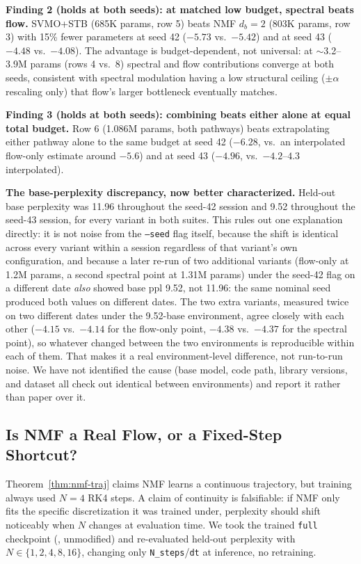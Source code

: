 \documentclass[conference]{IEEEtran}
\begin{document}
\textbf{Finding 2 (holds at both seeds): at matched low budget, spectral beats flow.} SVMO+STB (685K params, row 5) beats NMF $d_b{=}2$ (803K params, row 3) with 15\% fewer parameters at seed 42 ($-5.73$ vs.\ $-5.42$) and at seed 43 ($-4.48$ vs.\ $-4.08$). The advantage is budget-dependent, not universal: at $\sim$3.2--3.9M params (rows 4 vs.\ 8) spectral and flow contributions converge at both seeds, consistent with spectral modulation having a low structural ceiling ($\pm\alpha$ rescaling only) that flow's larger bottleneck eventually matches.

\textbf{Finding 3 (holds at both seeds): combining beats either alone at equal total budget.} Row 6 (1.086M params, both pathways) beats extrapolating either pathway alone to the same budget at seed 42 ($-6.28$, vs.\ an interpolated flow-only estimate around $-5.6$) and at seed 43 ($-4.96$, vs.\ $-4.2$--$4.3$ interpolated).

\textbf{The base-perplexity discrepancy, now better characterized.} Held-out base perplexity was 11.96 throughout the seed-42 session and 9.52 throughout the seed-43 session, for every variant in both suites. This rules out one explanation directly: it is not noise from the \texttt{--seed} flag itself, because the shift is identical across every variant within a session regardless of that variant's own configuration, and because a later re-run of two additional variants (flow-only at 1.2M params, a second spectral point at 1.31M params) under the seed-42 flag on a different date \emph{also} showed base ppl 9.52, not 11.96: the same nominal seed produced both values on different dates. The two extra variants, measured twice on two different dates under the 9.52-base environment, agree closely with each other ($-4.15$ vs.\ $-4.14$ for the flow-only point, $-4.38$ vs.\ $-4.37$ for the spectral point), so whatever changed between the two environments is reproducible within each of them. That makes it a real environment-level difference, not run-to-run noise. We have not identified the cause (base model, code path, library versions, and dataset all check out identical between environments) and report it rather than paper over it.

\subsection{Is NMF a Real Flow, or a Fixed-Step Shortcut?}
\label{sec:ode-invariance}

Theorem~\ref{thm:nmf-traj} claims NMF learns a continuous trajectory, but training always used $N{=}4$ RK4 steps. A claim of continuity is falsifiable: if NMF only fits the specific discretization it was trained under, perplexity should shift noticeably when $N$ changes at evaluation time. We took the trained \texttt{full} checkpoint (, unmodified) and re-evaluated held-out perplexity with $N \in \{1,2,4,8,16\}$, changing only \texttt{N\_steps}/\texttt{dt} at inference, no retraining.
\end{document}
